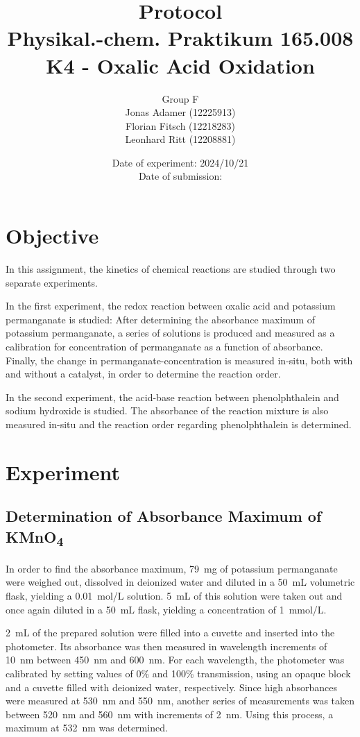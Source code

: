 \documentclass[titlepage]{article}
\title{Protocol \\ Physikal.-chem. Praktikum 165.008 \\ K4 - Oxalic Acid Oxidation}
\author{Group F\\Jonas Adamer (12225913)\\Florian Fitsch (12218283)\\Leonhard Ritt (12208881)}
\date{Date of experiment: 2024/10/21\\Date of submission:}
\begin{document}
\maketitle
\thispagestyle{empty}

\newpage
\tableofcontents
\thispagestyle{empty}

\addtocounter{page}{-1}

\newpage
\section{Objective}
In this assignment, the kinetics of chemical reactions are studied through two separate experiments.

In the first experiment, the redox reaction between oxalic acid and potassium permanganate is studied: After determining the absorbance maximum of potassium permanganate, a series of solutions is produced and measured as a calibration for concentration of permanganate as a function of absorbance. Finally, the change in permanganate-concentration is measured in-situ, both with and without a catalyst, in order to determine the reaction order.

In the second experiment, the acid-base reaction between phenolphthalein and sodium hydroxide is studied. The absorbance of the reaction mixture is also measured in-situ and the reaction order regarding phenolphthalein is determined.

\section{Experiment}
\subsection{Determination of Absorbance Maximum of KMnO\texorpdfstring{\textsubscript{4}}{4}} \label{ssec_experiment_abs_maximum}
In order to find the absorbance maximum, 79~mg of potassium permanganate were weighed out, dissolved in deionized water and diluted in a 50~mL volumetric flask, yielding a 0.01~mol/L solution. 5~mL of this solution were taken out and once again diluted in a 50~mL flask, yielding a concentration of 1~mmol/L.

2~mL of the prepared solution were filled into a cuvette and inserted into the photometer. Its absorbance was then measured in wavelength increments of 10~nm between 450~nm and 600~nm. For each wavelength, the photometer was calibrated by setting values of 0\% and 100\% transmission, using an opaque block and a cuvette filled with deionized water, respectively. Since high absorbances were measured at 530~nm and 550~nm, another series of measurements was taken between 520~nm and 560~nm with increments of 2~nm. Using this process, a maximum at 532~nm was determined.
\end{document}
